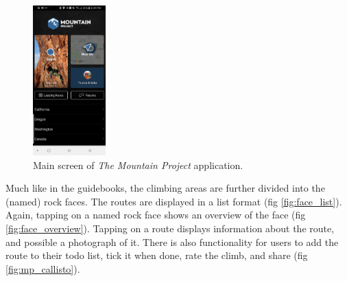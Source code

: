 \documentclass[10pt]{article}
\begin{document}
\begin{figure}[!htb]
  \centering
  \includegraphics[width=0.25\textwidth]{mp_home.jpg}
  \caption{Main screen of \emph{The Mountain Project} application.}
  \label{fig:mp_main}
\end{figure}

Much like in the guidebooks, the climbing areas are further divided into the (named) rock faces. The routes are displayed in a list format (fig \ref{fig:face_list}). Again, tapping on a named rock face shows an overview of the face (fig \ref{fig:face_overview}). Tapping on a route displays information about the route, and possible a photograph of it. There is also functionality for users to add the route to their todo list, tick it when done, rate the climb, and share (fig \ref{fig:mp_callisto}).
\end{document}
